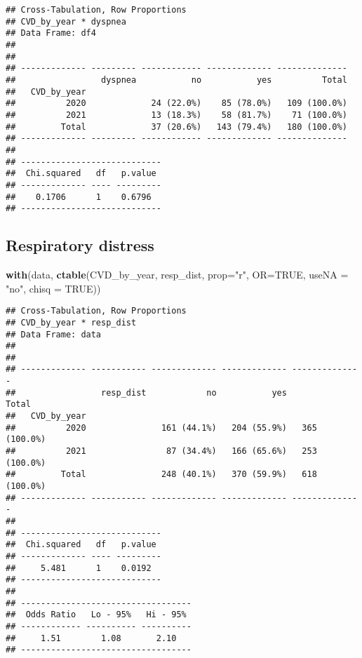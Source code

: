 \documentclass[
]{article}
\newenvironment{Shaded}{\begin{snugshade}}{\end{snugshade}}
\newcommand{\AttributeTok}[1]{\textcolor[rgb]{0.13,0.29,0.53}{#1}}
\newcommand{\ConstantTok}[1]{\textcolor[rgb]{0.56,0.35,0.01}{#1}}
\newcommand{\FunctionTok}[1]{\textcolor[rgb]{0.13,0.29,0.53}{\textbf{#1}}}
\newcommand{\NormalTok}[1]{#1}
\newcommand{\StringTok}[1]{\textcolor[rgb]{0.31,0.60,0.02}{#1}}
\begin{document}
\begin{verbatim}
## Cross-Tabulation, Row Proportions  
## CVD_by_year * dyspnea  
## Data Frame: df4  
## 
## 
## ------------- --------- ------------ ------------- --------------
##                 dyspnea           no           yes          Total
##   CVD_by_year                                                    
##          2020             24 (22.0%)    85 (78.0%)   109 (100.0%)
##          2021             13 (18.3%)    58 (81.7%)    71 (100.0%)
##         Total             37 (20.6%)   143 (79.4%)   180 (100.0%)
## ------------- --------- ------------ ------------- --------------
## 
## ----------------------------
##  Chi.squared   df   p.value 
## ------------- ---- ---------
##    0.1706      1    0.6796  
## ----------------------------
\end{verbatim}

\hypertarget{respiratory-distress}{%
\subsection{Respiratory distress}\label{respiratory-distress}}

\begin{Shaded}
\begin{Highlighting}[]
\FunctionTok{with}\NormalTok{(data, }\FunctionTok{ctable}\NormalTok{(CVD\_by\_year, resp\_dist, }\AttributeTok{prop=}\StringTok{"r"}\NormalTok{, }\AttributeTok{OR=}\ConstantTok{TRUE}\NormalTok{, }\AttributeTok{useNA =} \StringTok{"no"}\NormalTok{, }\AttributeTok{chisq =} \ConstantTok{TRUE}\NormalTok{))}
\end{Highlighting}
\end{Shaded}

\begin{verbatim}
## Cross-Tabulation, Row Proportions  
## CVD_by_year * resp_dist  
## Data Frame: data  
## 
## 
## ------------- ----------- ------------- ------------- --------------
##                 resp_dist            no           yes          Total
##   CVD_by_year                                                       
##          2020               161 (44.1%)   204 (55.9%)   365 (100.0%)
##          2021                87 (34.4%)   166 (65.6%)   253 (100.0%)
##         Total               248 (40.1%)   370 (59.9%)   618 (100.0%)
## ------------- ----------- ------------- ------------- --------------
## 
## ----------------------------
##  Chi.squared   df   p.value 
## ------------- ---- ---------
##     5.481      1    0.0192  
## ----------------------------
## 
## ----------------------------------
##  Odds Ratio   Lo - 95%   Hi - 95% 
## ------------ ---------- ----------
##     1.51        1.08       2.10   
## ----------------------------------
\end{verbatim}
\end{document}
